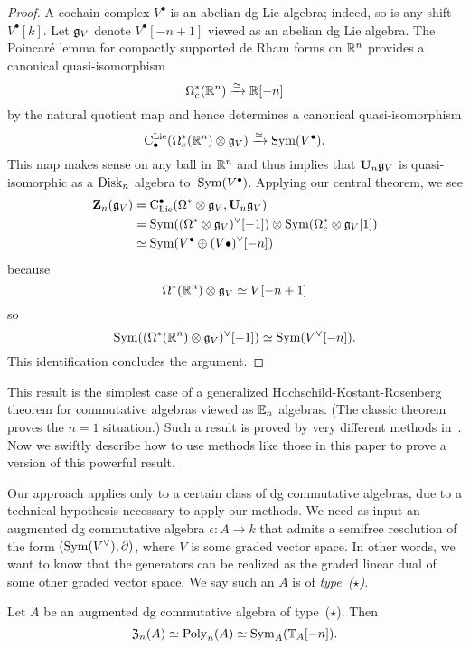 \documentclass[11pt]{amsart}
\numberwithin{equation}{section}
\begin{document}
\begin{proof}
A cochain complex $V^\bullet$ is an abelian dg Lie algebra;
indeed, so is any shift $V^\bullet[k]$. 
Let $\mathfrak g_V$ denote $V^\bullet[-n+1]$ viewed as an abelian dg Lie algebra.
The Poincar\'e lemma for compactly supported de Rham forms on $\mathbb R^n$ provides a canonical quasi-isomorphism
\[
\Omega^*_c(\mathbb R^n) \xrightarrow{\simeq} \mathbb R[-n]
\]
by the natural quotient map and hence determines a canonical quasi-isomorphism
\[
{\rm C}^{\rm Lie}_\bullet(\Omega^*_c(\mathbb R^n) \otimes \mathfrak g_V) \xrightarrow{\simeq} {\rm Sym}(V^\bullet).
\]
This map makes sense on any ball in $\mathbb R^n$ and thus implies that $\mathbf U_n \mathfrak g_V$ is quasi-isomorphic as a ${\rm Disk}_n$ algebra to~${\rm Sym}(V^\bullet)$.
Applying our central theorem, we see
\begin{align*}
\mathbf Z_n(\mathfrak g_V) &= {\rm C}_{\rm Lie}^\bullet(\Omega^* \otimes \mathfrak g_V, \mathbf U_n \mathfrak g_V) \\
&= {\rm Sym}((\Omega^* \otimes \mathfrak g_V)^\vee[-1]) \otimes {\rm Sym}(\Omega^*_c \otimes \mathfrak g_V[1])\\
& \simeq {\rm Sym}(V^\bullet \oplus (V\bullet)^\vee[-n])
\end{align*}
because
\[
\Omega^*(\mathbb R^n) \otimes \mathfrak g_V \simeq V[-n+1]
\]
so
\[
{\rm Sym}( (\Omega^*(\mathbb R^n) \otimes \mathfrak g_V)^\vee[-1]) \simeq {\rm Sym}( V^\vee[-n]).
\]
This identification concludes the argument.
\end{proof}

This result is the simplest case of a generalized Hochschild-Kostant-Rosenberg theorem for commutative algebras viewed as $\mathbb E_n$ algebras.
(The classic theorem proves the $n=1$ situation.)
Such a result is proved by very different methods in~\cite{CalWil}.
Now we swiftly describe how to use methods like those in this paper to prove a version of this powerful result.

Our approach applies only to a certain class of dg commutative algebras,
due to a technical hypothesis necessary to apply our methods.
We need as input an augmented dg commutative algebra $\epsilon: A \to k$ that admits a semifree resolution of the form $({\rm Sym}(V^\vee), \partial)$, where $V$ is some graded vector space.
In other words, we want to know that the generators can be realized as the graded linear dual of some other graded vector space.
We say such an $A$ is of {\em type~($\star$)}.

\begin{prp}
Let $A$ be an augmented dg commutative algebra of type~($\star$).
Then 
\[
{\frak Z}_n(A) \simeq {\rm Poly}_n(A) \simeq {\rm Sym}_A(\mathbb T_A[-n]).
\]
\end{prp}
\end{document}
